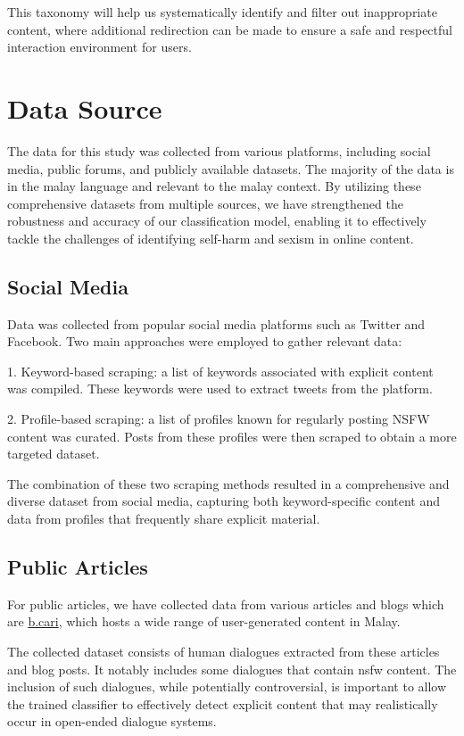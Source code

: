 \documentclass[preprint]{article}
\begin{document}
This taxonomy will help us systematically identify and filter out inappropriate content, where additional redirection can be made to ensure a safe and respectful interaction environment for users.

\section{Data Source}
The data for this study was collected from various platforms, including social media, public forums, and publicly available datasets. The majority of the data is in the malay language and relevant to the malay context.
By utilizing these comprehensive datasets from multiple sources, we have strengthened the robustness and accuracy of our classification model, enabling it to effectively tackle the challenges of identifying self-harm and sexism in online content.
\subsection{Social Media}
Data was collected from popular social media platforms such as Twitter and Facebook. Two main approaches were employed to gather relevant data:

1. Keyword-based scraping: a list of keywords associated with explicit content was compiled. These keywords were used to extract tweets from the platform.

2. Profile-based scraping: a list of profiles known for regularly posting NSFW content was curated. Posts from these profiles were then scraped to obtain a more targeted dataset.

The combination of these two scraping methods resulted in a comprehensive and diverse dataset from social media, capturing both keyword-specific content and data from profiles that frequently share explicit material.


\subsection{Public Articles}

For public articles, we have collected data from various articles and blogs which are \href{http://b.cari.com.my}{b.cari}, which hosts a wide range of user-generated content in Malay.

The collected dataset consists of human dialogues extracted from these articles and blog posts. It notably includes some dialogues that contain nsfw content. The inclusion of such dialogues, while potentially controversial, is important to allow the trained classifier to effectively detect explicit content that may realistically occur in open-ended dialogue systems.
\end{document}

